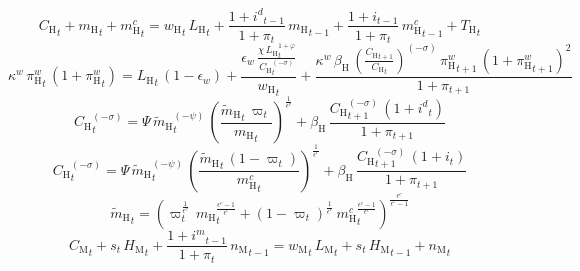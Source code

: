 \begin{dmath}
{C_\mathrm{H}}_{t}+{m_\mathrm{H}}_{t}+{m^c_\mathrm{H}}_{t}={w_\mathrm{H}}_{t}\, {L_\mathrm{H}}_{t}+\frac{1+{i^d}_{t-1}}{1+{\pi}_{t}}\, {m_\mathrm{H}}_{t-1}+\frac{1+{i}_{t-1}}{1+{\pi}_{t}}\, {m^c_\mathrm{H}}_{t-1}+{T_\mathrm{H}}_{t}
\end{dmath}
\begin{dmath}
{\kappa^w}\, {\pi^w_\mathrm{H}}_{t}\, \left(1+{\pi^w_\mathrm{H}}_{t}\right)={L_\mathrm{H}}_{t}\, \left(1-{\epsilon_w}\right)+\frac{{\epsilon_w}\, \frac{{\chi}\, {L_\mathrm{H}}_{t}^{1+{\varphi}}}{{C_\mathrm{H}}_{t}^{\left(-{\sigma}\right)}}}{{w_\mathrm{H}}_{t}}+\frac{{\kappa^w}\, {\beta_\mathrm{H}}\, \left(\frac{{C_\mathrm{H}}_{t+1}}{{C_\mathrm{H}}_{t}}\right)^{\left(-{\sigma}\right)}\, {\pi^w_\mathrm{H}}_{t+1}\, \left(1+{\pi^w_\mathrm{H}}_{t+1}\right)^{2}}{1+{\pi}_{t+1}}
\end{dmath}
\begin{dmath}
{C_\mathrm{H}}_{t}^{\left(-{\sigma}\right)}={\Psi}\, {\widetilde{m}_\mathrm{H}}_{t}^{\left(-{\psi}\right)}\, \left(\frac{{\widetilde{m}_\mathrm{H}}_{t}\, {\varpi}_{t}}{{m_\mathrm{H}}_{t}}\right)^{\frac{1}{{\epsilon^c}}}+{\beta_\mathrm{H}}\, \frac{{C_\mathrm{H}}_{t+1}^{\left(-{\sigma}\right)}\, \left(1+{i^d}_{t}\right)}{1+{\pi}_{t+1}}
\end{dmath}
\begin{dmath}
{C_\mathrm{H}}_{t}^{\left(-{\sigma}\right)}={\Psi}\, {\widetilde{m}_\mathrm{H}}_{t}^{\left(-{\psi}\right)}\, \left(\frac{{\widetilde{m}_\mathrm{H}}_{t}\, \left(1-{\varpi}_{t}\right)}{{m^c_\mathrm{H}}_{t}}\right)^{\frac{1}{{\epsilon^c}}}+{\beta_\mathrm{H}}\, \frac{{C_\mathrm{H}}_{t+1}^{\left(-{\sigma}\right)}\, \left(1+{i}_{t}\right)}{1+{\pi}_{t+1}}
\end{dmath}
\begin{dmath}
{\widetilde{m}_\mathrm{H}}_{t}=\left({\varpi}_{t}^{\frac{1}{{\epsilon^c}}}\, {m_\mathrm{H}}_{t}^{\frac{{\epsilon^c}-1}{{\epsilon^c}}}+\left(1-{\varpi}_{t}\right)^{\frac{1}{{\epsilon^c}}}\, {m^c_\mathrm{H}}_{t}^{\frac{{\epsilon^c}-1}{{\epsilon^c}}}\right)^{\frac{{\epsilon^c}}{{\epsilon^c}-1}}
\end{dmath}
\begin{dmath}
{C_\mathrm{M}}_{t}+{s}_{t}\, {H_\mathrm{M}}_{t}+\frac{1+{i^m}_{t-1}}{1+{\pi}_{t}}\, {n_\mathrm{M}}_{t-1}={w_\mathrm{M}}_{t}\, {L_\mathrm{M}}_{t}+{s}_{t}\, {H_\mathrm{M}}_{t-1}+{n_\mathrm{M}}_{t}
\end{dmath}
